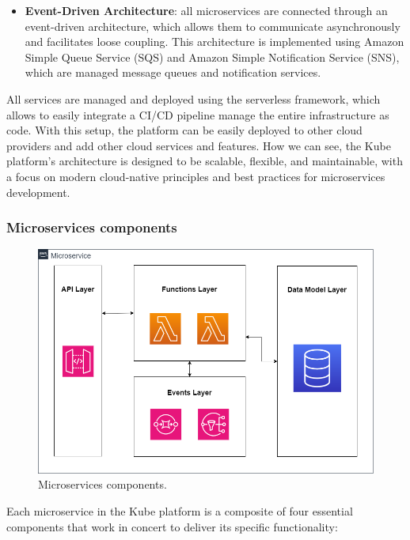 \begin{itemize}
    \item \textbf{Event-Driven Architecture}: all microservices are connected through an
          event-driven architecture, which allows them to communicate asynchronously and facilitates
          loose coupling. This architecture is implemented using Amazon Simple Queue Service (SQS)
          and Amazon Simple Notification Service (SNS), which are managed message queues and
          notification services.
\end{itemize}

All services are managed and deployed using the serverless framework, which allows to easily
integrate a CI/CD pipeline manage the entire infrastructure as code. With this setup, the platform
can be easily deployed to other cloud providers and add other cloud services and features. How we
can see, the Kube platform's architecture is designed to be scalable, flexible, and maintainable,
with a focus on modern cloud-native principles and best practices for microservices development.

\subsubsection{Microservices components}
\begin{figure}
    \centering
    \includegraphics[scale=0.28]{Pictures/5_microservizio.png}
    \caption{Microservices components.}
    \label{fig:5_microservices}
\end{figure}

Each microservice in the Kube platform is a composite of four essential components that work in
concert to deliver its specific functionality:


